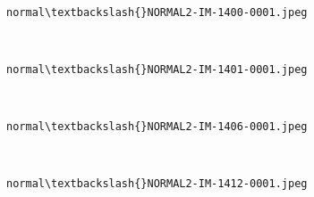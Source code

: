 \documentclass[11pt]{article}
\begin{document}
    \begin{center}
    \end{center}
    { \hspace*{\fill} \\}
    
    \begin{Verbatim}[commandchars=\\\{\}]
normal\textbackslash{}NORMAL2-IM-1400-0001.jpeg
    \end{Verbatim}

    \begin{center}
    \end{center}
    { \hspace*{\fill} \\}
    
    \begin{Verbatim}[commandchars=\\\{\}]
normal\textbackslash{}NORMAL2-IM-1401-0001.jpeg
    \end{Verbatim}

    \begin{center}
    \end{center}
    { \hspace*{\fill} \\}
    
    \begin{Verbatim}[commandchars=\\\{\}]
normal\textbackslash{}NORMAL2-IM-1406-0001.jpeg
    \end{Verbatim}

    \begin{center}
    \end{center}
    { \hspace*{\fill} \\}
    
    \begin{Verbatim}[commandchars=\\\{\}]
normal\textbackslash{}NORMAL2-IM-1412-0001.jpeg
    \end{Verbatim}

    \begin{center}
    \end{center}
    { \hspace*{\fill} \\}
    
\end{document}
